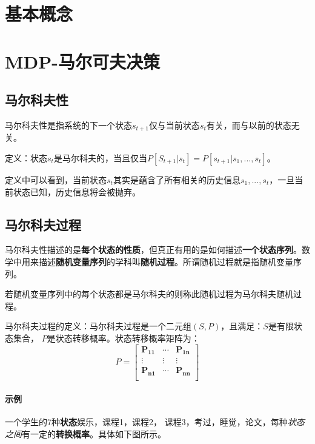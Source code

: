 \documentclass[UTF8,a4paper,12pt]{ctexbook}
\begin{document}
	\section{基本概念}
	
	\section{MDP-马尔可夫决策}
		\subsection{马尔科夫性}
			马尔科夫性是指系统的下一个状态$s_{t+1}$仅与当前状态$s_t$有关，而与以前的状态无关。
			
			定义：状态$s_t$是马尔科夫的，当且仅当$P[S_{t+1}|s_t] = P[s_{t+1}|s_1,...,s_t]$。
			
			定义中可以看到，当前状态$s_t$其实是蕴含了所有相关的历史信息$s_1,...,s_t$，一旦当前状态已知，历史信息将会被抛弃。
			
		\subsection{马尔科夫过程}
			马尔科夫性描述的是\textbf{每个状态的性质}，但真正有用的是如何描述\textbf{一个状态序列}。数学中用来描述\textbf{随机变量序列}的学科叫\textbf{随机过程}。所谓随机过程就是指随机变量序列。
			
			若随机变量序列中的每个状态都是马尔科夫的则称此随机过程为马尔科夫随机过程。
			
			马尔科夫过程的定义：马尔科夫过程是一个二元组$(S,P)$，且满足：$S$是有限状态集合， $P$是状态转移概率。状态转移概率矩阵为：
			$$
				P = \left[
							\begin{array}{ccc}
								\mathbf{P_{11}} & \cdots & \mathbf{P_{1n}}\\
								
								\vdots & \vdots & \vdots\\
								
								\mathbf{P_{n1}} & \cdots & \mathbf{P_{nn}}\\
							\end{array}
					\right]
			$$
			
			\paragraph{示例}
				一个学生的7种\textbf{状态}{娱乐，课程1，课程2， 课程3，考过，睡觉，论文}，每种\textit{状态之间}有一定的\textbf{转换概率}。具体如下图所示。
				
\end{document}
